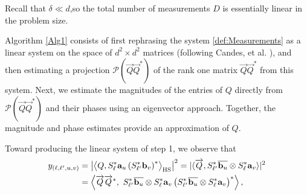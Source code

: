 \documentclass[]{spie}  %
\def \vec{\overrightarrow}
\def \a {\mathbf a}
\def \b {\mathbf b}
\def \bar {\overline}
\def \x {\mathbf x}
\def \y {\mathbf y}
\def \C {\mathbbm{C}}
\def \HS {\rm HS}
\DeclareMathOperator{\Tr}{\rm Trace}
\begin{document}
 Recall that $\delta \ll d$,so the total number of measurements $D$ is essentially linear in the problem size.


Algorithm \ref{Alg1} consists of first rephrasing the system \eqref{def:Measurements} as a linear system on the space of $d^2 \times d^2$ matrices (following Candes, et al. \cite{candes2013phaselift}), and then estimating a projection $\mathcal{P}( \vec{Q}\vec{Q}^*)$ of the rank one matrix $\vec{Q}\vec{Q}^*$ from this system.  Next, we estimate the magnitudes of the entries of $Q$ directly from $\mathcal{P}(\vec{Q}\vec{Q}^*)$ and their phases using an eigenvector approach.  Together, the magnitude and phase estimates provide an approximation of $Q$. 

Toward producing the linear system of step 1, we observe that
\begin{align*}%
y_{(\ell,\ell',u,v)} &= \left| \left\langle Q, S^*_{\ell} \a_u \left(S^*_{\ell'} \b_v \right)^* \right\rangle_{\HS} \right|^2 = |\langle \vec{Q}, S_{\ell'}^* \bar{\b_u} \otimes S_{\ell}^* \a_v \rangle |^2 \\%
&= \left\langle  \vec{Q} \vec{Q}^*, ~S_{\ell'}^* \bar{\b_u} \otimes S_{\ell}^* \a_v \left(S_{\ell'}^* \bar{\b_u} \otimes S_{\ell}^* \a_v\right)^* \right\rangle,
\end{align*} %
\end{document}
